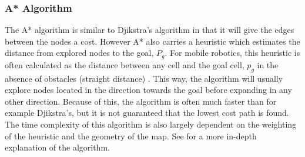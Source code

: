 \subsubsection{A* Algorithm}\label{T:AN:PP:DjikstrasPlanning}
The A* algorithm is similar to Djikstra's algorithm in that it will give the edges between the nodes a cost. However A* also carries a heuristic which estimates the distance from explored nodes to the goal, $P_g$. For mobile robotics, this heuristic is often calculated as the distance between any cell and the goal cell, $p_g$ in the absence of obstacles (straight distance) \cite{SiegwartRoland2011Itam}. This way, the algorithm will usually explore nodes located in the direction towards the goal before expanding in any other direction. Because of this, the algorithm is often much faster than for example Djikstra's, but it is not guaranteed that the lowest cost path is found. The time complexity of this algorithm is also largely dependent on the weighting of the heuristic and the geometry of the map. See \cite{SiegwartRoland2011Itam} for a more in-depth explanation of the algorithm.



